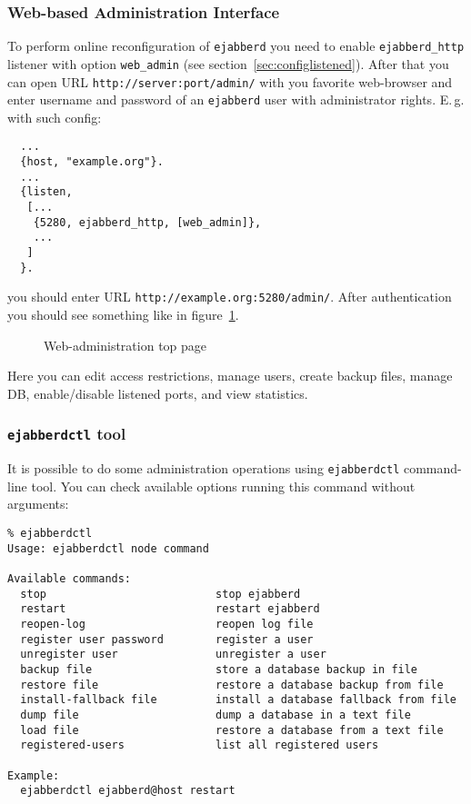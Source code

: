 \documentclass[a4paper,10pt]{article}
\newcommand{\imgscale}{0.58}
\newcommand{\insimg}[1]{\insscaleimg{\imgscale}{#1}}
\newcommand{\insscaleimg}[2]{
  \imgsrc{#2}{}
  \begin{latexonly}
    \scalebox{#1}{\texttt{[image: \#2]}}
  \end{latexonly}
}
\newcommand{\term}[1]{\texttt{#1}}
\newcommand{\ejabberd}{\texttt{ejabberd}}
\begin{document}
\subsubsection{Web-based Administration Interface}
\label{sec:webadm}

To perform online reconfiguration of \ejabberd{} you need to enable
\term{ejabberd\_http} listener with option \term{web\_admin} (see
section~\ref{sec:configlistened}).  After that you can open URL
\verb|http://server:port/admin/| with you favorite web-browser and enter
username and password of an \ejabberd{} user with administrator rights.  E.\,g.
with such config:
\begin{verbatim}
  ...
  {host, "example.org"}.
  ...
  {listen,
   [...
    {5280, ejabberd_http, [web_admin]},
    ...
   ]
  }.
\end{verbatim}
you should enter URL \verb|http://example.org:5280/admin/|.  After
authentication you should see something like in figure~\ref{fig:webadmmain}.
\begin{figure}[htbp]
  \centering
  \insimg{webadmmain.png}
  \caption{Web-administration top page}
  \label{fig:webadmmain}
\end{figure}
Here you can edit access restrictions, manage users, create backup files,
manage DB, enable/disable listened ports, and view statistics.


\subsubsection{\term{ejabberdctl} tool}
\label{sec:ejabberdctl}

It is possible to do some administration operations using \term{ejabberdctl}
command-line tool.  You can check available options running this command
without arguments:
\begin{verbatim}
% ejabberdctl
Usage: ejabberdctl node command

Available commands:
  stop                          stop ejabberd
  restart                       restart ejabberd
  reopen-log                    reopen log file
  register user password        register a user
  unregister user               unregister a user
  backup file                   store a database backup in file
  restore file                  restore a database backup from file
  install-fallback file         install a database fallback from file
  dump file                     dump a database in a text file
  load file                     restore a database from a text file
  registered-users              list all registered users

Example:
  ejabberdctl ejabberd@host restart
\end{verbatim}
\end{document}
